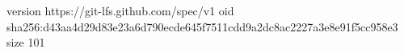 version https://git-lfs.github.com/spec/v1
oid sha256:d43aa4d29d83e23a6d790ecde645f7511cdd9a2dc8ac2227a3e8e91f5cc958e3
size 101
